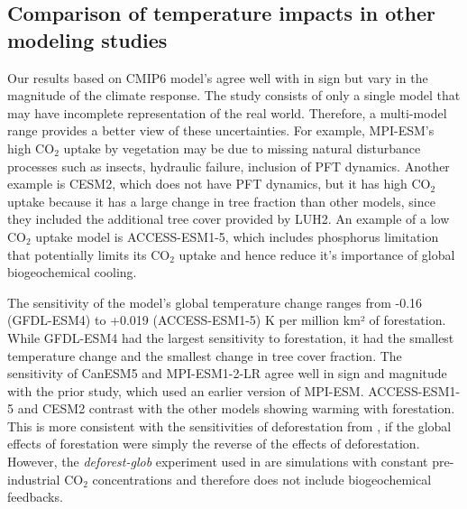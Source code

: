 \documentclass[draft]{agujournal2019}
\begin{document}
\subsection{Comparison of temperature impacts in other modeling studies}

Our results based on CMIP6 model's agree well with \cite{sonntag_quantifying_2018} in sign but vary in the magnitude of the climate response.
The  study consists of only a single model that may have incomplete representation of the real world.
Therefore, a multi-model range provides a better view of these uncertainties.
For example, MPI-ESM's high CO$_2$ uptake by vegetation may be due to missing natural disturbance processes such as insects, hydraulic failure, inclusion of PFT dynamics.
Another example is CESM2, which does not have PFT dynamics, but it has high CO$_2$ uptake because it has a large change in tree fraction than other models, since they included the additional tree cover provided by LUH2.
An example of a low CO$_2$ uptake model is ACCESS-ESM1-5, which includes phosphorus limitation that potentially limits its CO$_2$ uptake and hence reduce it's importance of global biogeochemical cooling.

The sensitivity of the model's global temperature change ranges from -0.16 (GFDL-ESM4) to +0.019 (ACCESS-ESM1-5) K per million km² of forestation.
While GFDL-ESM4 had the largest sensitivity to forestation, it had the smallest temperature change and the smallest change in tree cover fraction.
The sensitivity of CanESM5 and MPI-ESM1-2-LR agree well in sign and magnitude with the prior  study, which used an earlier version of MPI-ESM.
ACCESS-ESM1-5 and CESM2 contrast with the other models showing warming with forestation.
This is more consistent with the sensitivities of deforestation from , if the global effects of forestation were simply the reverse of the effects of deforestation.
However, the \textit{deforest-glob} experiment used in  are simulations with constant pre-industrial CO$_2$ concentrations and therefore does not include biogeochemical feedbacks.
\end{document}
